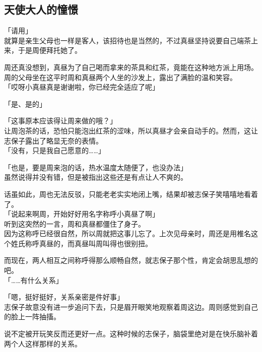 \subsection{天使大人的憧憬}

「请用」\\

就算是亲生父母也一样是客人，该招待也是当然的，不过真昼坚持说要自己端茶上来，于是周便拜托她了。

周还真没想到，真昼为了自己喝而拿来的茶具和红茶，竟能在这种地方派上用场。\\

周的父母坐在这平时周和真昼两个人坐的沙发上，露出了满脸的温和笑容。\\

「哎呀小真昼真是谢谢啦，你已经完全适应了呢」

「是、是的」

「这事原本应该得让周来做的哦？」\\

让周泡茶的话，恐怕只能泡出红茶的涩味，所以真昼才会亲自动手的。然而，这让志保子露出了略显无奈的表情。\\

「没有，只是我自己愿意的……」

「也是，要是周来泡的话，热水温度太随便了，也没办法」\\

虽然说得并没有错，但是被指出这些还是有点让人不爽的。

话虽如此，周也无法反驳，只能老老实实地闭上嘴，结果却被志保子笑嘻嘻地看着了。\\

「说起来啊周，开始好好用名字称呼小真昼了啊」\\

听到这突然的一言，周和真昼都僵住了身子。\\

因为这称呼已经很自然，所以周就把这事儿忘了。上次见母亲时，周还是用椎名这个姓氏称呼真昼的，而真昼叫周叫得也很别扭。

而现在，两人相互之间称呼得那么顺畅自然，就志保子那个性，肯定会胡思乱想的吧。\\

「……有什么关系」

「嗯，挺好挺好，关系亲密是件好事」\\

志保子故意没有进一步追问下去，只是眉开眼笑地观察着周这边。周则感觉到自己的脸上一阵抽搐。

说不定被开玩笑反而还更好一点。这种时候的志保子，脑袋里绝对是在快乐脑补着两个人这样那样的关系。\\

